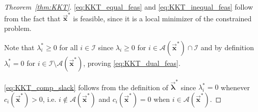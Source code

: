 \documentclass[9pt, headings=standardclasses, parskip=half]{scrartcl}
\newcommand{\vect}[1]{\vec{\boldsymbol{#1}}}
\begin{document}
\begin{proof}[Theorem~\ref{thm:KKT}]
  \eqref{eq:KKT_equal_feas} and \eqref{eq:KKT_inequal_feas} follow from the fact that \(\vect{x}^{\ast}\) is feasible, since it is a local minimizer of the constrained problem.
  
  Note that \(\lambda_{i}^{\ast} \ge 0\) for all \(i\in\mathcal{I}\) since \(\lambda_{i} \ge 0\) for \(i\in\mathcal{A}(\vect{x}^{\ast}) \cap \mathcal{I}\) and by definition \(\lambda_{i}^{\ast} = 0\) for \(i\in\mathcal{I} \setminus \mathcal{A}(\vect{x}^{\ast})\), proving \eqref{eq:KKT_dual_feas}.

  \eqref{eq:KKT_comp_slack} follows from the definition of \(\vect{\lambda}^{\ast}\) since \(\lambda_{i}^{\ast} = 0\) whenever \(c_{i}(\vect{x}^{\ast}) > 0\), i.e. \(i \notin \mathcal{A}(\vect{x}^{\ast})\) and \(c_{i}(\vect{x}^{\ast}) = 0\) when \(i \in \mathcal{A}(\vect{x}^{\ast})\).
\end{proof}
\end{document}
